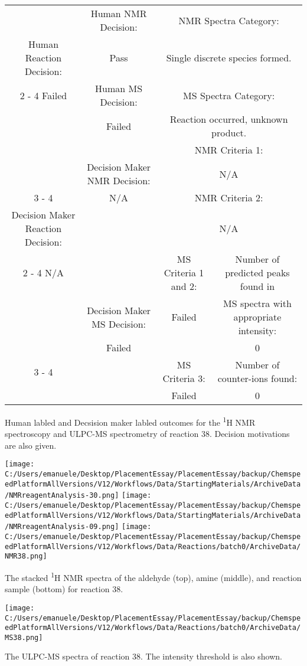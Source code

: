\documentclass{article}%
\begin{document}
\begin{Decision Table}[H]%
\begin{tabular}{|c|c|c|c|}%
\hline%
&Human NMR Decision:&\multicolumn{2}{|c|}{NMR Spectra Category:}\\%
Human Reaction Decision:&Pass&\multicolumn{2}{|c|}{Single discrete species formed.}\\%
\cline{2%
-%
4}%
Failed&Human MS Decision:&\multicolumn{2}{|c|}{MS Spectra Category:}\\%
&Failed&\multicolumn{2}{|c|}{Reaction occurred, unknown product.}\\%
\hline%
&&\multicolumn{2}{|c|}{NMR Criteria 1:}\\%
&Decision Maker NMR Decision:&\multicolumn{2}{|c|}{N/A}\\%
\cline{3%
-%
4}%
&N/A&\multicolumn{2}{|c|}{NMR Criteria 2:}\\%
Decision Maker Reaction Decision:&&\multicolumn{2}{|c|}{N/A}\\%
\cline{2%
-%
4}%
N/A&&MS Criteria 1 and 2:&Number of predicted peaks found in\\%
&Decision Maker MS Decision:&Failed&MS spectra with appropriate intensity:\\%
&Failed&&0\\%
\cline{3%
-%
4}%
&&MS Criteria 3:&Number of counter{-}ions found:\\%
&&Failed&0\\%
\hline%
\end{tabular}%
\caption{Human labled and Decsision maker labled outcomes for the \textsuperscript{1}H NMR spectroscopy and ULPC-MS spectrometry of reaction 38. Decision motivations are also given.}%
\end{Decision Table}%
\begin{NMR Spectra}[H]%
\begin{center}%
\texttt{[image: C:/Users/emanuele/Desktop/PlacementEssay/PlacementEssay/backup/ChemspeedPlatformAllVersions/V12/Workflows/Data/StartingMaterials/ArchiveData/NMRreagentAnalysis-30.png]}\hfill%
\texttt{[image: C:/Users/emanuele/Desktop/PlacementEssay/PlacementEssay/backup/ChemspeedPlatformAllVersions/V12/Workflows/Data/StartingMaterials/ArchiveData/NMRreagentAnalysis-09.png]}\hfill%
\texttt{[image: C:/Users/emanuele/Desktop/PlacementEssay/PlacementEssay/backup/ChemspeedPlatformAllVersions/V12/Workflows/Data/Reactions/batch0/ArchiveData/NMR38.png]}\hfill%
\end{center}%
\caption{The stacked \textsuperscript{1}H NMR spectra of the aldehyde (top), amine (middle), and reaction sample (bottom) for reaction 38.}%
\end{NMR Spectra}%
\begin{MS Spectra}[H]%
\begin{center}%
\texttt{[image: C:/Users/emanuele/Desktop/PlacementEssay/PlacementEssay/backup/ChemspeedPlatformAllVersions/V12/Workflows/Data/Reactions/batch0/ArchiveData/MS38.png]}\hfill%
\end{center}%
\caption{The ULPC-MS spectra of reaction 38. The intensity threshold is also shown.}%
\end{MS Spectra}%
\end{document}
